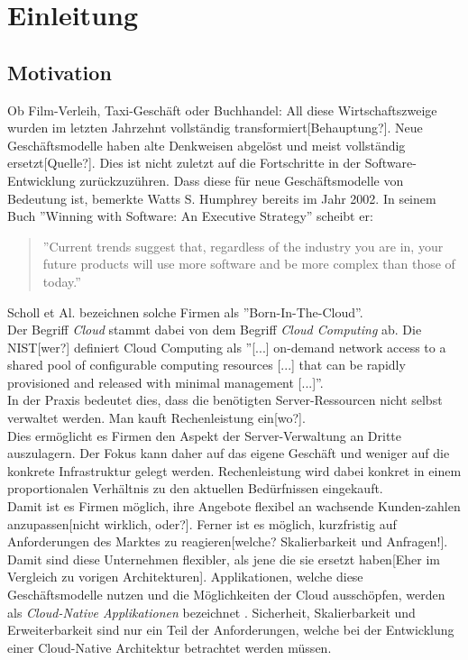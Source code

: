 \chapter{Einleitung}

\section{Motivation}
Ob Film-Verleih, Taxi-Geschäft oder Buchhandel: All diese Wirtschaftszweige wurden im letzten Jahrzehnt vollständig transformiert[Behauptung?].  Neue Geschäftsmodelle haben alte Denkweisen abgelöst und meist vollständig ersetzt[Quelle?]. Dies ist nicht zuletzt auf die Fortschritte in der Software-Entwicklung zurückzuzühren. Dass diese für neue Geschäftsmodelle von Bedeutung ist, bemerkte Watts S. Humphrey bereits im Jahr 2002. In seinem Buch ''Winning with Software: An Executive Strategy'' scheibt er: 
\begin{quote}
''Current trends suggest that, regardless of the industry you are in, your future products will use more software and be more complex than those of today.'' \cite{humphrey_why_2002}
\end{quote}
Scholl et Al. bezeichnen solche Firmen als ''Born-In-The-Cloud''\cite{scholl_cloud_2019}.\\
Der Begriff \textit{Cloud} stammt dabei von dem Begriff \textit{Cloud Computing} ab. Die NIST[wer?] definiert Cloud Computing als ''[...] on-demand network access to a shared pool of configurable computing resources [...] that can be rapidly provisioned and released with minimal management [...]''\cite{mell_nist_2011}.\\
In der Praxis bedeutet dies, dass die benötigten Server-Ressourcen nicht selbst verwaltet werden. Man kauft Rechenleistung ein[wo?].\\
Dies ermöglicht es Firmen den Aspekt der Server-Verwaltung an Dritte auszulagern. Der Fokus kann daher auf das eigene Geschäft und weniger auf die konkrete Infrastruktur gelegt werden. Rechenleistung wird dabei konkret in einem proportionalen Verhältnis zu den aktuellen Bedürfnissen eingekauft.\\
Damit ist es Firmen möglich, ihre Angebote flexibel an wachsende Kunden-zahlen anzupassen[nicht wirklich, oder?]. Ferner ist es möglich, kurzfristig auf Anforderungen des Marktes zu reagieren[welche? Skalierbarkeit und Anfragen!]. Damit sind diese Unternehmen flexibler, als jene die sie ersetzt haben[Eher im Vergleich zu vorigen Architekturen]. Applikationen, welche diese Geschäftsmodelle nutzen und die Möglichkeiten der Cloud ausschöpfen, werden als \textit{Cloud-Native Applikationen} bezeichnet \cite{scholl_cloud_2019}.  Sicherheit, Skalierbarkeit und Erweiterbarkeit sind nur ein Teil der Anforderungen, welche bei der Entwicklung einer Cloud-Native Architektur betrachtet werden müssen. 

